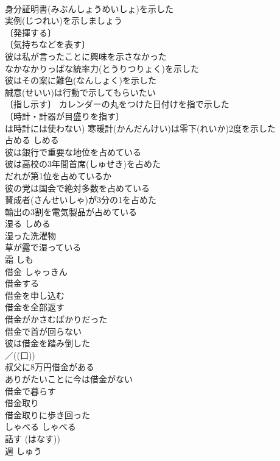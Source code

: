 \documentclass[8pt]{extreport}
\begin{document}
\begin{CJK}{UTF8}{min}
\\	身分証明書(みぶんしょうめいしょ)を示した 
\\	実例(じつれい)を示しましょう 
\\	〔発揮する〕
\\	〔気持ちなどを表す〕
\\	彼は私が言ったことに興味を示さなかった 
\\	なかなかりっぱな統率力(とうりつりょく)を示した 
\\	彼はその案に難色(なんしょく)を示した 
\\	誠意(せいい)は行動で示してもらいたい 
\\	〔指し示す〕 カレンダーの丸をつけた日付けを指で示した 
\\	〔時計・計器が目盛りを指す〕
\\	は時計には使わない) 寒暖計(かんだんけい)は零下(れいか)2度を示した 
\\	占める	しめる	
\\	彼は銀行で重要な地位を占めている 
\\	彼は高校の3年間首席(しゅせき)を占めた 
\\	だれが第1位を占めているか 
\\	彼の党は国会で絶対多数を占めている 
\\	賛成者(さんせいしゃ)が3分の1を占めた 
\\	輸出の3割を電気製品が占めている 
\\	湿る	しめる	
\\	湿った洗濯物 
\\	草が露で湿っている 
\\	霜	しも	
\\	借金	しゃっきん	
\\	借金する 
\\	借金を申し込む 
\\	借金を全部返す 
\\	借金がかさむばかりだった 
\\	借金で首が回らない 
\\	彼は借金を踏み倒した 
\\	／((口)) 
\\	叔父に8万円借金がある 
\\	ありがたいことに今は借金がない 
\\	借金で暮らす 
\\	借金取り 
\\	借金取りに歩き回った 
\\	しゃべる	しゃべる	
\\	話す (はなす))
\\	週	しゅう	

\end{CJK}
\end{document}
